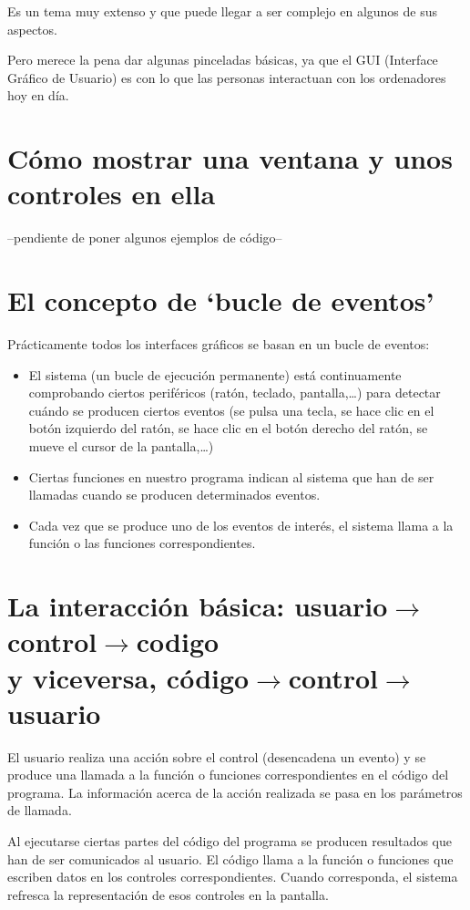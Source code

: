 \documentclass[spanish,12pt,a4paper,final,oneside]{book}
\begin{document}
Es un tema muy extenso y que puede llegar a ser complejo en algunos de sus aspectos.

Pero merece la pena dar algunas pinceladas básicas, ya que el GUI (Interface Gráfico de Usuario) es con lo que las personas interactuan con los ordenadores hoy en día.

\section{Cómo mostrar una ventana y unos controles en ella}

--pendiente de poner algunos ejemplos de código--

\section{El concepto de `bucle de eventos'}

Prácticamente todos los interfaces gráficos se basan en un bucle de eventos:
\begin{itemize}
\item El sistema (un bucle de ejecución permanente) está continuamente comprobando ciertos periféricos (ratón, teclado, pantalla,\ldots) para detectar cuándo se producen ciertos eventos (se pulsa una tecla, se hace clic en el botón izquierdo del ratón, se hace clic en el botón derecho del ratón, se mueve el cursor de la pantalla,\ldots)
\item Ciertas funciones en nuestro programa indican al sistema que han de ser llamadas cuando se producen determinados eventos.
\item Cada vez que se produce uno de los eventos de interés, el sistema llama a la función o las funciones correspondientes.
\end{itemize}

\section{La interacción básica: usuario$\rightarrow$control$\rightarrow$codigo \\  y viceversa, código$\rightarrow$control$\rightarrow$usuario}

El usuario realiza una acción sobre el control (desencadena un evento) y se produce una llamada a la función o funciones correspondientes en el código del programa. La información acerca de la acción realizada se pasa en los parámetros de llamada.

Al ejecutarse ciertas partes del código del programa se producen resultados que han de ser comunicados al usuario. El código llama a la función o funciones que escriben datos en los controles correspondientes. Cuando corresponda, el sistema refresca la representación de esos controles en la pantalla.
\end{document}
